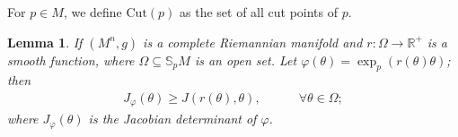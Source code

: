 \documentclass[11pt]{amsart}
\newtheorem{lemma}[theorem]{Lemma}
\numberwithin{equation}{section}
\begin{document}
For $p\in M$,  we define $\mathrm{Cut}(p)$ as the set of all cut points of $p$.

\begin{lemma}\label{lem volume of surface in term of polar Jac}
  If $(M^n, g)$ is a complete Riemannian manifold and $r: \Omega\rightarrow \mathbb{R}^+$ is a smooth function, where $\Omega\subseteq \mathbb{S}_pM$ is an open set. Let $\varphi(\theta)=\exp_p(r(\theta)\theta)$; then
    \begin{align}
        J_\varphi(\theta)\geq J(r(\theta),\theta), \quad \quad \quad \forall \theta\in \Omega; \nonumber 
    \end{align}
where $J_\varphi(\theta)$ is the Jacobian determinant of $\varphi$. 

\end{lemma}
\end{document}
